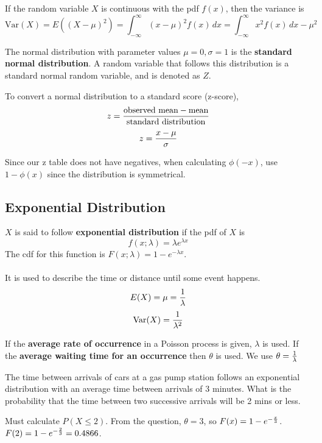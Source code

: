 \documentclass[english, 12pt]{article}
\begin{document}
\begin{defn}
If the random variable $X$ is continuous with the pdf $f(x)$, then the variance is
\[\text{Var}(X) = E((X-\mu)^2) = \int_{-\infty}^\infty (x-\mu)^2 f(x)\,dx = \int_{-\infty}^\infty x^2 f(x)\,dx - \mu^2\]
\end{defn}



\begin{defn}
The normal distribution with parameter values $\mu = 0, \sigma = 1$ is the \textbf{standard normal distribution}. A random variable that follows this distribution is a standard normal random variable, and is denoted as $Z$.
\end{defn}

To convert a normal distribution to a standard score (z-score),
\[z = \frac{\text{observed mean} - \text{mean}}{\text{standard distribution}}\]
\[z = \frac{x - \mu}{\sigma}\]


\begin{note}
Since our z table does not have negatives, when calculating $\phi(-x)$, use $1 - \phi(x)$ since the distribution is symmetrical.
\end{note}

\subsection{Exponential Distribution}
\begin{defn}
$X$ is said to follow \textbf{exponential distribution} if the pdf of $X$ is
\[f(x;\lambda) = \lambda e^{\lambda x}\]
The cdf for this function is $F(x;\lambda) = 1 - e^{- \lambda x}$. \\\\
It is used to describe the time or distance until some event happens.
\[E(X) = \mu = \frac{1}{\lambda}\]
\[\text{Var}(X) = \frac{1}{\lambda^2}\]

\begin{note}
If the \textbf{average rate of occurrence} in a Poisson process is given, $\lambda$ is used. If the \textbf{average waiting time for an occurrence} then $\theta$ is used. We use $\theta = \frac{1}{\lambda}$
\end{note}
\end{defn}

\begin{exmp}
The time between arrivals of cars at a gas pump station follows an exponential distribution with an average time between arrivals of 3 minutes. What is the probability that the time between two successive arrivals will be 2 mins or less.

\begin{sol}
Must calculate $P(X \leq 2)$. From the question, $\theta = 3$, so $F(x) = 1 - e^{-\frac{x}{3}}$. $F(2) = 1 - e^{-\frac{2}{3}} = 0.4866$.
\end{sol}
\end{exmp}
\end{document}
